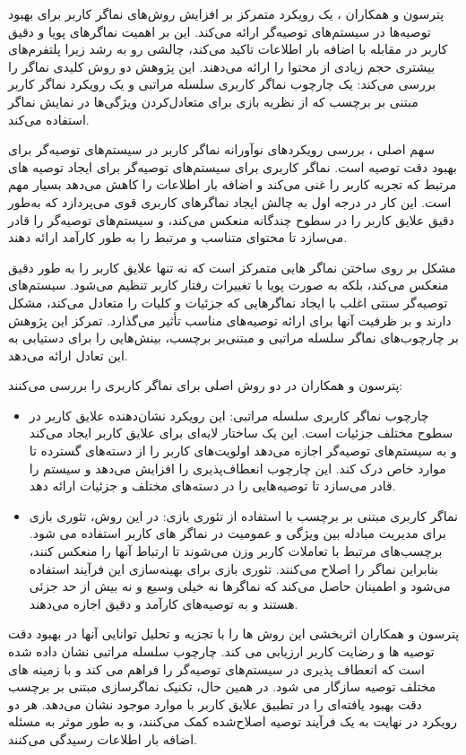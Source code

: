 پترسون و همکاران %
\cite{peterson2021user}،
 یک رویکرد متمرکز بر افزایش روش‌های نماگر کاربر برای بهبود توصیه‌ها در سیستم‌های توصیه‌گر ارائه می‌کند. این بر اهمیت نماگر‌های پویا و دقیق کاربر در مقابله با اضافه بار اطلاعات تاکید می‌کند، چالشی رو به رشد زیرا پلتفرم‌های بیشتری حجم زیادی از محتوا را ارائه می‌دهند. این پژوهش دو روش کلیدی نماگر را بررسی می‌کند: یک چارچوب نماگر کاربری سلسله مراتبی و یک رویکرد نماگر کاربر مبتنی بر برچسب که از نظریه بازی برای متعادل‌کردن ویژگی‌ها در نمایش نماگر استفاده می‌کند.

سهم اصلی \cite{peterson2021user}، بررسی رویکردهای نوآورانه نماگر کاربر در سیستم‌های توصیه‌گر برای بهبود دقت توصیه است. نماگر کاربری برای سیستم‌های توصیه‌گر برای ایجاد توصیه های مرتبط که تجربه کاربر را غنی می‌کند و اضافه بار اطلاعات را کاهش می‌دهد بسیار مهم است. این کار در درجه اول به چالش ایجاد نماگر‌های کاربری قوی می‌پردازد که به‌طور دقیق علایق کاربر را در سطوح چندگانه منعکس می‌کند، و سیستم‌های توصیه‌گر را قادر می‌سازد تا محتوای متناسب و مرتبط را به طور کارآمد ارائه دهند.

مشکل بر روی ساختن نماگر هایی متمرکز است که نه تنها علایق کاربر را به طور دقیق منعکس می‌کند، بلکه به صورت پویا با تغییرات رفتار کاربر تنظیم می‌شود. سیستم‌های توصیه‌گر سنتی اغلب با ایجاد نماگر‌هایی که جزئیات و کلیات را متعادل می‌کند، مشکل دارند و بر ظرفیت آنها برای ارائه توصیه‌های مناسب تأثیر می‌گذارد. تمرکز این پژوهش بر چارچوب‌های نماگر سلسله مراتبی و مبتنی‌بر برچسب، بینش‌هایی را برای دستیابی به این تعادل ارائه می‌دهد.

پترسون و همکاران در 
\cite{peterson2021user}
دو روش اصلی برای نماگر کاربری را بررسی می‌کنند:
\begin{itemize}
\item
چارچوب نماگر کاربری سلسله مراتبی: این رویکرد نشان‌دهنده علایق کاربر در سطوح مختلف جزئیات است. این یک ساختار لایه‌ای برای علایق کاربر ایجاد می‌کند و به سیستم‌های توصیه‌گر اجازه می‌دهد اولویت‌های کاربر را از دسته‌های گسترده تا موارد خاص درک کند. این چارچوب انعطاف‌پذیری را افزایش می‌دهد و سیستم را قادر می‌سازد تا توصیه‌هایی را در دسته‌های مختلف و جزئیات ارائه دهد.
\item
نماگر کاربری مبتنی بر برچسب با استفاده از تئوری بازی: در این روش، تئوری بازی برای مدیریت مبادله بین ویژگی و عمومیت در نماگر های کاربر استفاده می شود. برچسب‌های مرتبط با تعاملات کاربر وزن می‌شوند تا ارتباط آنها را منعکس کنند، بنابراین نماگر را اصلاح می‌کنند. تئوری بازی برای بهینه‌سازی این فرآیند استفاده می‌شود و اطمینان حاصل می‌کند که نماگر‌ها نه خیلی وسیع و نه بیش از حد جزئی هستند و به توصیه‌های کارآمد و دقیق اجازه می‌دهند.
\end{itemize}
پترسون و همکاران
\cite{peterson2021user}
اثربخشی این روش ها را با تجزیه و تحلیل توانایی آنها در بهبود دقت توصیه ها و رضایت کاربر ارزیابی می کند. چارچوب سلسله مراتبی نشان داده شده است که انعطاف پذیری در سیستم‌های توصیه‌گر را فراهم می کند و با زمینه های مختلف توصیه سازگار می شود. در همین حال، تکنیک نماگر‌سازی مبتنی بر برچسب دقت بهبود یافته‌ای را در تطبیق علایق کاربر با موارد موجود نشان می‌دهد. هر دو رویکرد در نهایت به یک فرآیند توصیه اصلاح‌شده کمک می‌کنند، و به طور موثر به مسئله اضافه بار اطلاعات رسیدگی می‌کنند.


